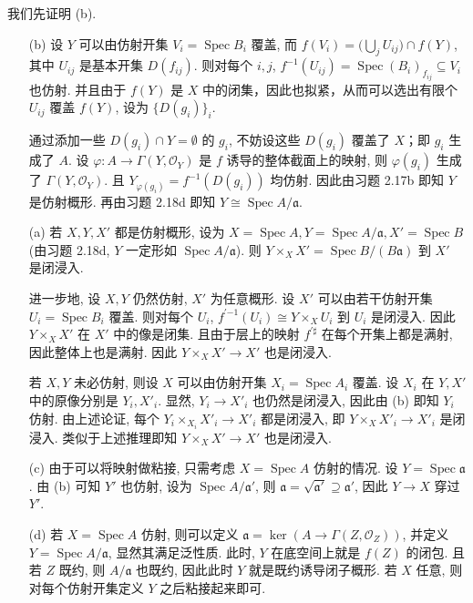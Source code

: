 \documentclass{article}
\theoremstyle{exercise}
\newenvironment{proofc}{\proof}{\endproof}
\def\ga{\mathfrak{a}}
\def\sO{\mathcal{O}}
\def\Spec{\operatorname{Spec}}
\begin{document}
\begin{proofc}
  我们先证明 (b).
  \begin{enumerate}
    \item[(b)] 设 $Y$ 可以由仿射开集 $V_i = \Spec B_i$ 覆盖,
          而 $f(V_i) = \bigl(\bigcup_j U_{ij}\bigr) \cap f(Y)$,
          其中 $U_{ij}$ 是基本开集 $D(f_{ij})$.
          则对每个 $i, j$, $f^{-1}(U_{ij}) = \Spec (B_i)_{f_{ij}} \subseteq V_i$ 也仿射.
          并且由于 $f(Y)$ 是 $X$ 中的闭集，因此也拟紧，从而可以选出有限个 $U_{ij}$ 覆盖 $f(Y)$,
          设为 $\{ D(g_i) \}_i$.

          通过添加一些 $D(g_i) \cap Y = \emptyset$ 的 $g_i$,
          不妨设这些 $D(g_i)$ 覆盖了 $X$；即 $g_i$ 生成了 $A$.
          设 $\varphi \colon A \to \Gamma(Y, \sO_Y)$ 是 $f$ 诱导的整体截面上的映射,
          则 $\varphi(g_i)$ 生成了 $\Gamma(Y, \sO_Y)$.
          且 $Y_{\varphi(g_i)} = f^{-1}(D(g_i))$ 均仿射.
          因此由习题 2.17b 即知 $Y$ 是仿射概形.
          再由习题 2.18d 即知 $Y \cong \Spec A / \ga$.

    \item[(a)] 若 $X, Y, X'$ 都是仿射概形, 设为 $X = \Spec A, Y = \Spec A / \ga, X' = \Spec B$
          (由习题 2.18d, $Y$ 一定形如 $\Spec A / \ga$).
          则 $Y \times_X X' = \Spec B / (B \ga)$ 到 $X'$ 是闭浸入.

          进一步地, 设 $X, Y$ 仍然仿射, $X'$ 为任意概形.
          设 $X'$ 可以由若干仿射开集 $U_i = \Spec B_i$ 覆盖.
          则对每个 $U_i$, $f^{\prime {-1}}(U_i) \cong Y \times_X U_i$ 到 $U_i$ 是闭浸入.
          因此 $Y \times_X X'$ 在 $X'$ 中的像是闭集.
          且由于层上的映射 $f^{\prime\sharp}$ 在每个开集上都是满射, 因此整体上也是满射.
          因此 $Y \times_X X' \to X'$ 也是闭浸入.

          若 $X, Y$ 未必仿射, 则设 $X$ 可以由仿射开集 $X_i = \Spec A_i$ 覆盖.
          设 $X_i$ 在 $Y, X'$ 中的原像分别是 $Y_i, X'_i$.
          显然, $Y_i \to X'_i$ 也仍然是闭浸入, 因此由 (b) 即知 $Y_i$ 仿射.
          由上述论证, 每个 $Y_i \times_{X_i} X'_i \to X'_i$ 都是闭浸入,
          即 $Y \times_X X'_i \to X'_i$ 是闭浸入.
          类似于上述推理即知 $Y \times_X X' \to X'$ 也是闭浸入.
    \item[(c)] 由于可以将映射做粘接, 只需考虑 $X = \Spec A$ 仿射的情况.
          设 $Y = \Spec \ga$. 由 (b) 可知 $Y'$ 也仿射, 设为 $\Spec A / \ga'$,
          则 $\ga = \sqrt{\ga'} \supseteq \ga'$, 因此 $Y \to X$ 穿过 $Y'$.
    \item[(d)] 若 $X = \Spec A$ 仿射, 则可以定义 $\ga = \ker (A \to \Gamma(Z, \sO_Z))$,
          并定义 $Y = \Spec A / \ga$, 显然其满足泛性质.
          此时, $Y$ 在底空间上就是 $f(Z)$ 的闭包.
          且若 $Z$ 既约, 则 $A / \ga$ 也既约, 因此此时 $Y$ 就是既约诱导闭子概形.
          若 $X$ 任意, 则对每个仿射开集定义 $Y$ 之后粘接起来即可.
          \qedhere
  \end{enumerate}
\end{proofc}
\end{document}
